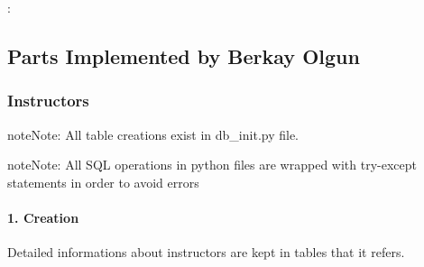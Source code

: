 \documentclass[letterpaper,10pt,english]{sphinxmanual}
\begin{document}
:

\begin{sphinxVerbatim}[commandchars=\\\{\}]
  

    

        
           
\end{sphinxVerbatim}


\subsection{Parts Implemented by Berkay Olgun}
\label{\detokenize{developer/berkay:parts-implemented-by-berkay-olgun}}\label{\detokenize{developer/berkay::doc}}

\subsubsection{Instructors}
\label{\detokenize{developer/berkay:instructors}}
\begin{sphinxadmonition}{note}{Note:}
All table creations exist in db\_init.py file.
\end{sphinxadmonition}

\begin{sphinxadmonition}{note}{Note:}
All SQL operations in python files are wrapped with try-except statements in order to avoid errors
\end{sphinxadmonition}


\paragraph{1. Creation}
\label{\detokenize{developer/berkay:creation}}
Detailed informations about instructors are kept in tables that it refers.
\end{document}

